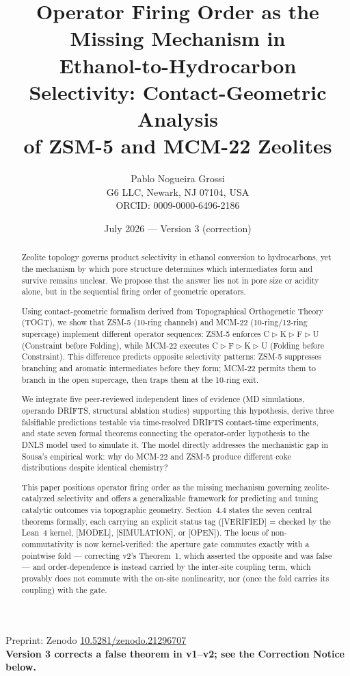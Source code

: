 \documentclass[11pt]{article}
\title{\Large Operator Firing Order as the Missing Mechanism in\\
Ethanol-to-Hydrocarbon Selectivity: Contact-Geometric Analysis\\
of ZSM-5 and MCM-22 Zeolites}
\author{Pablo Nogueira Grossi\\[2pt]\small G6 LLC, Newark, NJ 07104, USA\\[2pt]\small ORCID: 0009-0000-6496-2186}
\date{July 2026 --- Version 3 (correction)}
\newcommand{\comp}{\mathrel{\triangleright}} %
\begin{document}
\maketitle

\begin{center}
\small
Preprint: Zenodo \href{https://doi.org/10.5281/zenodo.21296707}{10.5281/zenodo.21296707}\\[2pt]
\textbf{Version 3 corrects a false theorem in v1--v2; see the Correction Notice below.}
\end{center}

\begin{abstract}
Zeolite topology governs product selectivity in ethanol conversion to hydrocarbons, yet the mechanism by which pore structure determines which intermediates form and survive remains unclear. We propose that the answer lies not in pore size or acidity alone, but in the sequential firing order of geometric operators.

Using contact-geometric formalism derived from Topographical Orthogenetic Theory (TOGT), we show that ZSM-5 (10-ring channels) and MCM-22 (10-ring/12-ring supercage) implement different operator sequences: ZSM-5 enforces C$\comp$K$\comp$F$\comp$U (Constraint before Folding), while MCM-22 executes C$\comp$F$\comp$K$\comp$U (Folding before Constraint). This difference predicts opposite selectivity patterns: ZSM-5 suppresses branching and aromatic intermediates before they form; MCM-22 permits them to branch in the open supercage, then traps them at the 10-ring exit.

We integrate five peer-reviewed independent lines of evidence (MD simulations, operando DRIFTS, structural ablation studies) supporting this hypothesis, derive three falsifiable predictions testable via time-resolved DRIFTS contact-time experiments, and state seven formal theorems connecting the operator-order hypothesis to the DNLS model used to simulate it. The model directly addresses the mechanistic gap in Sousa's empirical work: why do MCM-22 and ZSM-5 produce different coke distributions despite identical chemistry?

This paper positions operator firing order as the missing mechanism governing zeolite-catalyzed selectivity and offers a generalizable framework for predicting and tuning catalytic outcomes via topographic geometry. Section~4.4 states the seven central theorems formally, each carrying an explicit status tag ([VERIFIED] = checked by the Lean~4 kernel, [MODEL], [SIMULATION], or [OPEN]). The locus of non-commutativity is now kernel-verified: the aperture gate commutes exactly with a pointwise fold --- correcting v2's Theorem~1, which asserted the opposite and was false --- and order-dependence is instead carried by the inter-site coupling term, which provably does not commute with the on-site nonlinearity, nor (once the fold carries its coupling) with the gate.
\end{abstract}
\end{document}
